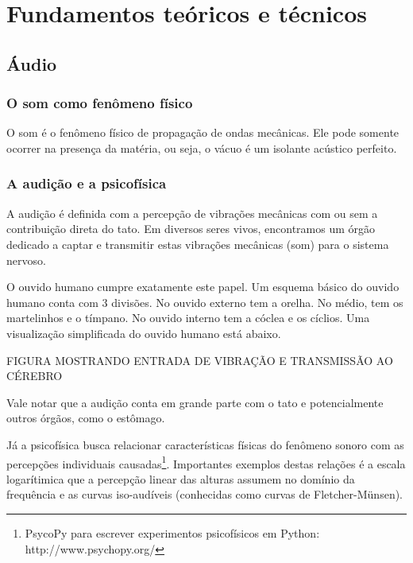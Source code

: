 \chapter{Fundamentos teóricos e técnicos} %
\label{cap:intro} %

\section{Áudio}

\subsection{O som como fenômeno físico}

O som é o fenômeno físico de propagação de ondas mecânicas. Ele pode
somente ocorrer na presença da matéria, ou seja, o vácuo é um
isolante acústico perfeito.

\subsection{A audição e a psicofísica}

A audição é definida com a percepção de vibrações mecânicas com
ou sem a contribuição direta do tato. Em diversos
seres vivos, encontramos um órgão dedicado a captar e transmitir
estas vibrações mecânicas (som) para o sistema nervoso.

O ouvido humano cumpre exatamente este papel. Um esquema básico
do ouvido humano conta com 3 divisões. No ouvido externo tem a orelha.
No médio, tem os martelinhos e o tímpano. No ouvido interno tem a cóclea
e os cíclios. Uma visualização simplificada do ouvido humano está abaixo.


FIGURA MOSTRANDO ENTRADA DE VIBRAÇÃO E TRANSMISSÃO AO CÉREBRO

Vale notar que a audição conta em grande parte com o tato e potencialmente
outros órgãos, como o estômago.

Já a psicofísica busca relacionar características físicas do fenômeno sonoro
com as percepções individuais causadas\footnote{PsycoPy para escrever experimentos psicofísicos em Python: http://www.psychopy.org/}.
Importantes exemplos destas relações
é a escala logarítimica que a percepção linear das alturas assumem no
domínio da frequência e as curvas iso-audíveis (conhecidas como curvas de Fletcher-Münsen).

